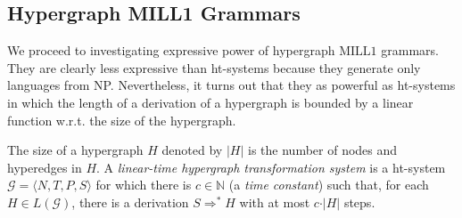 \documentclass[a4paper,UKenglish,cleveref, autoref, thm-restate,pdfa]{lipics-v2021}
\newcommand{\Nat}{\mathbb{N}}
\newcommand{\Gram}{\mathcal{G}}
\newcommand{\MILLFO}{\mathrm{MILL}1}
\begin{document}
\subsection{Hypergraph MILL1 Grammars}\label{subsection:hypergraph-MILL1-grammars}

We proceed to investigating expressive power of hypergraph $\MILLFO$ grammars. They are clearly less expressive than ht-systems because they generate only languages from NP. Nevertheless, it turns out that they as powerful as ht-systems in which the length of a derivation of a hypergraph is bounded by a linear function w.r.t. the size of the hypergraph.
\begin{definition}
	The size of a hypergraph $H$ denoted by $\vert H \vert$ is the number of nodes and hyperedges in $H$. A \emph{linear-time hypergraph transformation system} is a ht-system $\Gram = \langle N, T, P, S\rangle$ for which there is $c \in \Nat$ (a \emph{time constant}) such that, for each $H \in L(\Gram)$, there is a derivation $S \Rightarrow^\ast H$ with at most $c \cdot \vert H\vert$ steps.
\end{definition}
\end{document}
